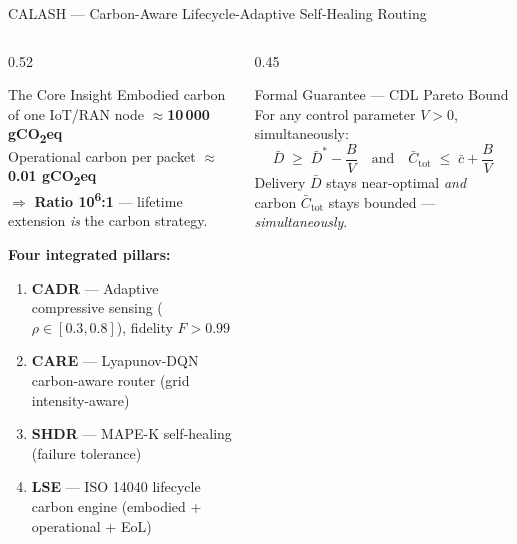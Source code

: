 \documentclass[aspectratio=169, 11pt]{beamer}
\begin{document}
\begin{frame}{CALASH — Carbon-Aware Lifecycle-Adaptive Self-Healing Routing}

\begin{columns}[T]
\begin{column}{0.52\textwidth}

  \begin{block}{The Core Insight}
    \vspace{2pt}
    Embodied carbon of one IoT/RAN node $\approx$\textbf{10\,000 gCO\textsubscript{2}eq}\\
    Operational carbon per packet $\approx$\textbf{0.01 gCO\textsubscript{2}eq}\\[4pt]
    $\Rightarrow$ \textbf{Ratio 10\textsuperscript{6}:1} — lifetime extension \textit{is} the carbon strategy.
    \vspace{2pt}
  \end{block}

  \vspace{4pt}
  \textbf{Four integrated pillars:}
  \begin{enumerate}\setlength{\itemsep}{2pt}
    \item \textbf{CADR} — Adaptive compressive sensing ($\rho \!\in\! [0.3, 0.8]$), fidelity $F \!>\! 0.99$
    \item \textbf{CARE} — Lyapunov-DQN carbon-aware router (grid intensity-aware)
    \item \textbf{SHDR} — MAPE-K self-healing (failure tolerance)
    \item \textbf{LSE} — ISO 14040 lifecycle carbon engine (embodied + operational + EoL)
  \end{enumerate}

\end{column}
\begin{column}{0.45\textwidth}

  \begin{alertblock}{Formal Guarantee — CDL Pareto Bound}
    \vspace{2pt}
    For any control parameter $V > 0$, simultaneously:
    \[
      \bar{D} \;\geq\; \bar{D}^* - \frac{B}{V}
      \quad\text{and}\quad
      \bar{C}_{\mathrm{tot}} \;\leq\; \bar{c} + \frac{B}{V}
    \]
    {\small Delivery $\bar{D}$ stays near-optimal \textit{and} carbon $\bar{C}_{\mathrm{tot}}$ stays bounded — \textit{simultaneously}.}
    \vspace{2pt}
  \end{alertblock}


\end{column}
\end{columns}
\end{frame}
\end{document}
